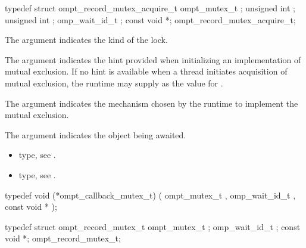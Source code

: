 \record

\begin{ccppspecific}
\begin{omptRecord}
typedef struct ompt_record_mutex_acquire_t {
  ompt_mutex_t ;
  unsigned int ;
  unsigned int ;
  omp_wait_id_t ;
  const void *;
} ompt_record_mutex_acquire_t;
\end{omptRecord}
\end{ccppspecific}


\argdesc

The argument  indicates the kind of the lock.

The argument  indicates the hint provided when initializing
an implementation of mutual exclusion.
If no hint is available when a thread initiates acquisition of mutual exclusion,
the runtime may supply  as the value for .

The argument  indicates the mechanism chosen by the
runtime to implement the mutual exclusion.

The argument  indicates the object being awaited.

\codeptrdesc

\crossreferences
\begin{itemize}
\item {} type, see
.
\item {} type, see
.
\end{itemize}



\label{sec:ompt_callback_mutex_t}
\format

\begin{ccppspecific}
\begin{omptCallback}
typedef void (*ompt_callback_mutex_t) (
  ompt_mutex_t ,
  omp_wait_id_t ,
  const void *
);
\end{omptCallback}
\end{ccppspecific}


\record

\begin{ccppspecific}
\begin{omptRecord}
typedef struct ompt_record_mutex_t {
  ompt_mutex_t ;
  omp_wait_id_t ;
  const void *;
} ompt_record_mutex_t;
\end{omptRecord}
\end{ccppspecific}


